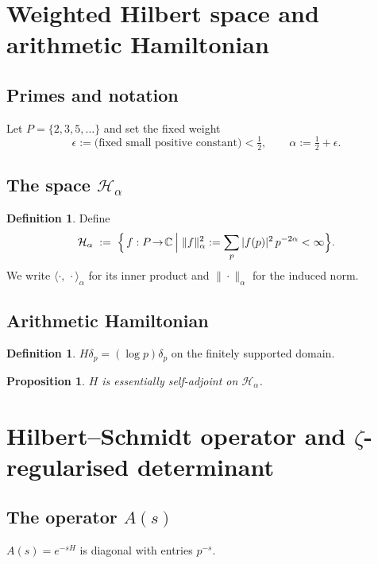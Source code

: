 \documentclass[12pt]{article}
\newtheorem{proposition}[theorem]{Proposition}
\theoremstyle{definition}
\newtheorem{definition}[theorem]{Definition}
\theoremstyle{remark}
\newcommand{\inner}[2]{\langle #1,\,#2\rangle}
\newcommand{\Hspace}{\mathcal H}
\begin{document}
\section{Weighted Hilbert space and arithmetic Hamiltonian}

\subsection{Primes and notation}
Let \(P=\{2,3,5,\dots\}\) and set the fixed weight
\[
   \epsilon := \text{(fixed small positive constant)} < \tfrac12,\qquad
    \alpha := \tfrac12+\epsilon.\]

\subsection{The space \texorpdfstring{$\Hspace_\alpha$}{H\_\alpha}}

\begin{definition}\label{def:Hphi}
Define
\[
   \Hspace_{\alpha}\;:=\;
   \Bigl\{\,f:P\!\to\!\Bbb C
          \:\Big|\;
          \|f\|_{\alpha}^{2}:=\sum_{p}|f(p)|^{2}\,p^{-2\alpha}<\infty
   \Bigr\}.
\]
We write $\inner{\cdot}{\cdot}_\alpha$ for its inner product and
$\|\cdot\|_\alpha$ for the induced norm.
\end{definition}

\subsection{Arithmetic Hamiltonian}
\begin{definition}
\(H\delta_{p}=(\log p)\delta_{p}\) on the finitely supported domain.
\end{definition}

\begin{proposition}
\(H\) is essentially self-adjoint on \(\Hspace_{\alpha}\).
\end{proposition}

\section{Hilbert--Schmidt operator and $\zeta$-regularised determinant}

\subsection{The operator \(A(s)\)}
\(A(s)=e^{-sH}\) is diagonal with entries \(p^{-s}\).
\end{document}

